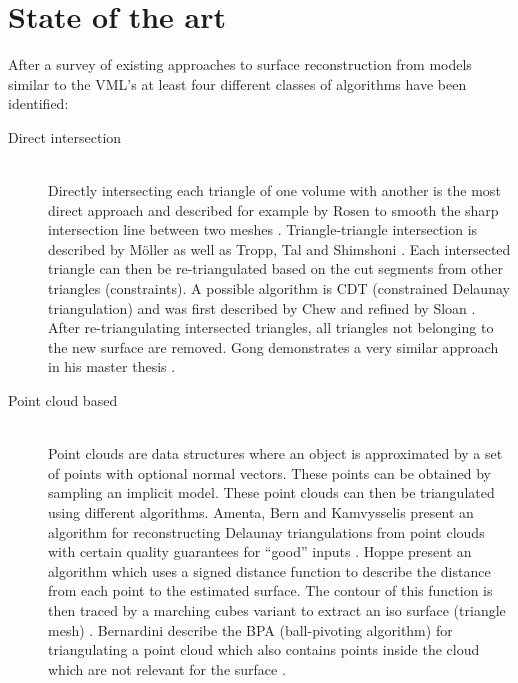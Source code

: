 
\chapter{State of the art}
\label{ch:state_of_the_art}


After a survey of existing approaches to surface reconstruction from models similar to the VML's at least four different classes of algorithms have been identified:

\begin{description}
	
	\item[Direct intersection] \hfill \\
	Directly intersecting each triangle of one volume with another is the most direct approach and described for example by Rosen to smooth the sharp intersection line between two meshes \cite{mesh_intersection}. Triangle-triangle intersection is described by M\"oller \cite{tri_tri_intersection_moller} as well as Tropp, Tal and Shimshoni \cite{tri_tri_intersection_2}. Each intersected triangle can then be re-triangulated based on the cut segments from other triangles (constraints). A possible algorithm is CDT (constrained Delaunay triangulation) and was first described by Chew \cite{cdt} and refined by Sloan \cite{cdt_fast}. After re-triangulating intersected triangles, all triangles not belonging to the new surface are removed. Gong demonstrates a very similar approach in his master thesis \cite{cutter_workpiece_engagement}.
	
	\item[Point cloud based] \hfill \\
	Point clouds are data structures where an object is approximated by a set of points with optional normal vectors. These points can be obtained \eg by sampling an implicit model. These point clouds can then be triangulated using different algorithms. 
	Amenta, Bern and Kamvysselis present an algorithm for reconstructing Delaunay triangulations from point clouds with certain quality guarantees for \enquote{good} inputs \cite{vornoi_surface_reconstruction}.
	Hoppe \etal present an algorithm which uses a signed distance function to describe the distance from each point to the estimated surface. The contour of this function is then traced by a marching cubes variant to extract an iso surface (triangle mesh) \cite{surface_reconstruction}.
	Bernardini \etal describe the BPA (ball-pivoting algorithm) for triangulating a point cloud which also contains points inside the cloud which are not relevant for the surface \cite{bpa}.
	

\end{description}
